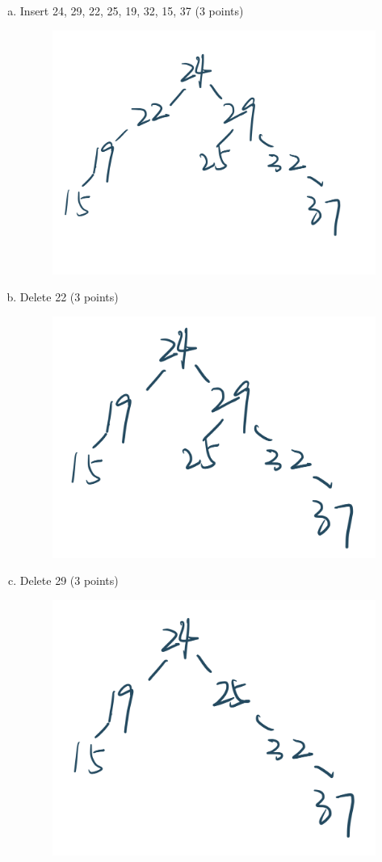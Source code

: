 \documentclass[11pt]{exam}
\begin{document}
\begin{enumerate}[a)]
\item Insert 24, 29, 22, 25, 19, 32, 15, 37 (3 points)
\begin{solution}
\begin{figure}[H]
    \centering
    \includegraphics[width=.5\linewidth]{3.png}
\end{figure}
\end{solution}

\item Delete 22 (3 points)
\begin{solution}
\begin{figure}[H]
    \centering
    \includegraphics[width=.4\linewidth]{4.png}
\end{figure}
\end{solution}

\item Delete 29 (3 points)
\begin{solution}
\begin{figure}[H]
    \centering
    \includegraphics[width=.4\linewidth]{5.png}
\end{figure}
\end{solution}


\end{enumerate}
\end{document}
